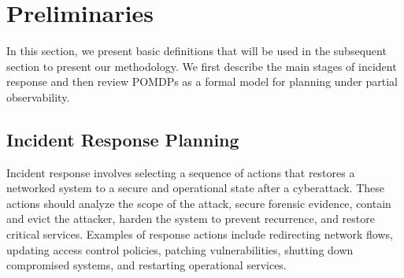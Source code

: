 \documentclass[sigconf]{acmart}
\begin{document}


\section{Preliminaries}
In this section, we present basic definitions that will be used in the subsequent section to present our methodology. We first describe the main stages of incident response and then review POMDPs as a formal model for planning under partial observability.

\subsection{Incident Response Planning}\label{subsec:ir}
Incident response involves selecting a sequence of actions that restores a networked system to a secure and operational state after a cyberattack. These actions should analyze the scope of the attack, secure forensic evidence, contain and evict the attacker, harden the system to prevent recurrence, and restore critical services. Examples of response actions include redirecting network flows, updating access control policies, patching vulnerabilities, shutting down compromised systems, and restarting operational services.
\end{document}
